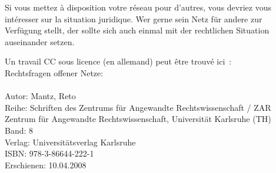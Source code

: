 Si vous mettez à disposition votre réseau pour d'autres, vous devriez
vous intéresser sur la situation juridique.
Wer gerne sein Netz für andere zur Verfügung stellt, der sollte sich auch
einmal mit der rechtlichen Situation auseinander setzen.

Un travail CC sous licence (en allemand) peut être trouvé ici~:\\
Rechtsfragen offener Netze:\\
\\
Autor: Mantz, Reto\\
Reihe: Schriften des Zentrums für Angewandte Rechtswissenschaft / ZAR\\
Zentrum für Angewandte Rechtswissenschaft, Universität Karlsruhe (TH)\\
Band: 8\\
Verlag: Universitätsverlag Karlsruhe\\
ISBN: 978-3-86644-222-1\\
Erschienen: 10.04.2008
